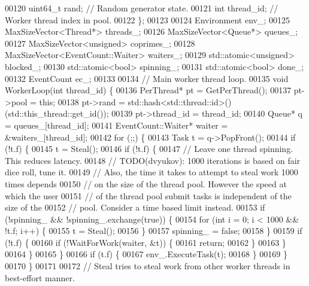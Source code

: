 \begin{DoxyCode}
{00120     uint64\_t rand;  \textcolor{comment}{// Random generator state.}
00121     \textcolor{keywordtype}{int} thread\_id;  \textcolor{comment}{// Worker thread index in pool.}
00122   \};
00123 
00124   Environment env\_;
00125   MaxSizeVector<Thread*> threads\_;
00126   MaxSizeVector<Queue*> queues\_;
00127   MaxSizeVector<unsigned> coprimes\_;
00128   MaxSizeVector<EventCount::Waiter> waiters\_;
00129   std::atomic<unsigned> blocked\_;
00130   std::atomic<bool> spinning\_;
00131   std::atomic<bool> done\_;
00132   EventCount ec\_;
00133 
00134   \textcolor{comment}{// Main worker thread loop.}
00135   \textcolor{keywordtype}{void} WorkerLoop(\textcolor{keywordtype}{int} thread\_id) \{
00136     PerThread* pt = GetPerThread();
00137     pt->pool = \textcolor{keyword}{this};
00138     pt->rand = std::hash<std::thread::id>()(std::this\_thread::get\_id());
00139     pt->thread\_id = thread\_id;
00140     Queue* q = queues\_[thread\_id];
00141     EventCount::Waiter* waiter = &waiters\_[thread\_id];
00142     \textcolor{keywordflow}{for} (;;) \{
00143       Task t = q->PopFront();
00144       \textcolor{keywordflow}{if} (!t.f) \{
00145         t = Steal();
00146         \textcolor{keywordflow}{if} (!t.f) \{
00147           \textcolor{comment}{// Leave one thread spinning. This reduces latency.}
00148           \textcolor{comment}{// TODO(dvyukov): 1000 iterations is based on fair dice roll, tune it.}
00149           \textcolor{comment}{// Also, the time it takes to attempt to steal work 1000 times depends}
00150           \textcolor{comment}{// on the size of the thread pool. However the speed at which the user}
00151           \textcolor{comment}{// of the thread pool submit tasks is independent of the size of the}
00152           \textcolor{comment}{// pool. Consider a time based limit instead.}
00153           \textcolor{keywordflow}{if} (!spinning\_ && !spinning\_.exchange(\textcolor{keyword}{true})) \{
00154             \textcolor{keywordflow}{for} (\textcolor{keywordtype}{int} i = 0; i < 1000 && !t.f; i++) \{
00155               t = Steal();
00156             \}
00157             spinning\_ = \textcolor{keyword}{false};
00158           \}
00159           \textcolor{keywordflow}{if} (!t.f) \{
00160             \textcolor{keywordflow}{if} (!WaitForWork(waiter, &t)) \{
00161               \textcolor{keywordflow}{return};
00162             \}
00163           \}
00164         \}
00165       \}
00166       \textcolor{keywordflow}{if} (t.f) \{
00167         env\_.ExecuteTask(t);
00168       \}
00169     \}
00170   \}
00171 
00172   \textcolor{comment}{// Steal tries to steal work from other worker threads in best-effort manner.}
}
\end{DoxyCode}
